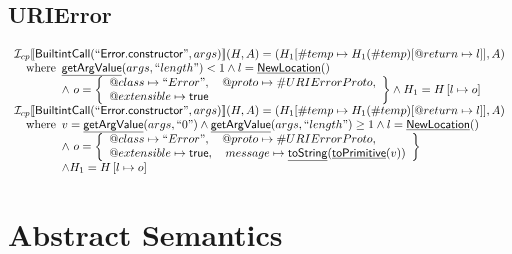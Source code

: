 \documentclass{article}
\makeatletter
\newcommand{\SF}[1]{\mbox{\textsf{#1}}}
\newcommand{\wherec}[1]{{\rm where}\begin{array}[t]{l}#1\end{array}}
\newcommand{\I}{\mathcal{I}}
\newcommand{\set}[1]{\left\{\begin{array}{l}#1\end{array}\right\}}
\newcommand{\lbr}{\llbracket}
\newcommand{\rbr}{\rrbracket}
\newcommand{\hf}[1]{\underline{\sf #1}}
\newcommand{\varprop}[1]{@#1}
\newcommand{\vtrue}{\SF{true}}
\makeatother
\begin{document}
\subsection{URIError}
\[
\begin{array}{l}
\I _{cp}\lbr \SF{BuiltintCall}(``\SF{Error.constructor}",args)\rbr(H,A)
  = (H_1[\#temp \mapsto H_1(\#temp)[@return \mapsto l]], A)\\
\quad\wherec{
  \hf{getArgValue}(args, ``length") < 1 
  \land l=\hf{NewLocation}()\\
  \land\ o = \set{
    \varprop{class}\mapsto ``Error", \quad
    \varprop{proto}\mapsto \#URIErrorProto,\\
    \varprop{extensible}\mapsto \vtrue
    }
  \land H_1=H\left[l\mapsto o\right]\\
  }\\
  
\I _{cp}\lbr \SF{BuiltintCall}(``\SF{Error.constructor}",args)\rbr(H,A)
  = (H_1[\#temp \mapsto H_1(\#temp)[@return \mapsto l]], A)\\
\quad\wherec{
  v = \hf{getArgValue}(args, ``0") \land \hf{getArgValue}(args, ``length") \geq 1
  \land l=\hf{NewLocation}()\\
  \land\ o = \set{
    \varprop{class}\mapsto ``Error", \quad
    \varprop{proto}\mapsto \#URIErrorProto,\\
    \varprop{extensible}\mapsto \vtrue,  \quad
    message \mapsto \hf{toString}(\hf{toPrimitive}(v)) 
    }\\
  \land H_1=H\left[l\mapsto o\right]
  }\\

\end{array}
\]


\section{Abstract Semantics}
\end{document}
